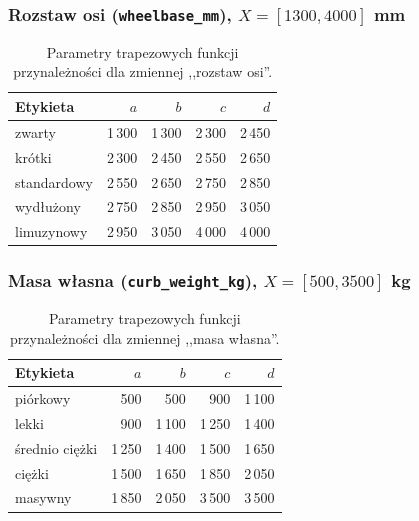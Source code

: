 \documentclass{article}
\begin{document}
\subsubsection{Rozstaw osi (\texttt{wheelbase\_mm}), $X = [1300, 4000]$ mm}
\begin{table}[H]
\centering
\caption{Parametry trapezowych funkcji przynależności dla zmiennej
,,rozstaw osi''.}
\label{tab:mf-wheelbase}
\begin{tabular}{l r r r r}
\toprule
Etykieta & $a$ & $b$ & $c$ & $d$ \\
\midrule
zwarty       & 1\,300 & 1\,300 & 2\,300 & 2\,450 \\
krótki       & 2\,300 & 2\,450 & 2\,550 & 2\,650 \\
standardowy  & 2\,550 & 2\,650 & 2\,750 & 2\,850 \\
wydłużony    & 2\,750 & 2\,850 & 2\,950 & 3\,050 \\
limuzynowy   & 2\,950 & 3\,050 & 4\,000 & 4\,000 \\
\bottomrule
\end{tabular}
\end{table}

\subsubsection{Masa własna (\texttt{curb\_weight\_kg}), $X = [500, 3500]$ kg}
\begin{table}[H]
\centering
\caption{Parametry trapezowych funkcji przynależności dla zmiennej
,,masa własna''.}
\label{tab:mf-mass}
\begin{tabular}{l r r r r}
\toprule
Etykieta & $a$ & $b$ & $c$ & $d$ \\
\midrule
piórkowy        &   500 &   500 &   900 & 1\,100 \\
lekki           &   900 & 1\,100 & 1\,250 & 1\,400 \\
średnio ciężki  & 1\,250 & 1\,400 & 1\,500 & 1\,650 \\
ciężki          & 1\,500 & 1\,650 & 1\,850 & 2\,050 \\
masywny         & 1\,850 & 2\,050 & 3\,500 & 3\,500 \\
\bottomrule
\end{tabular}
\end{table}
\end{document}
